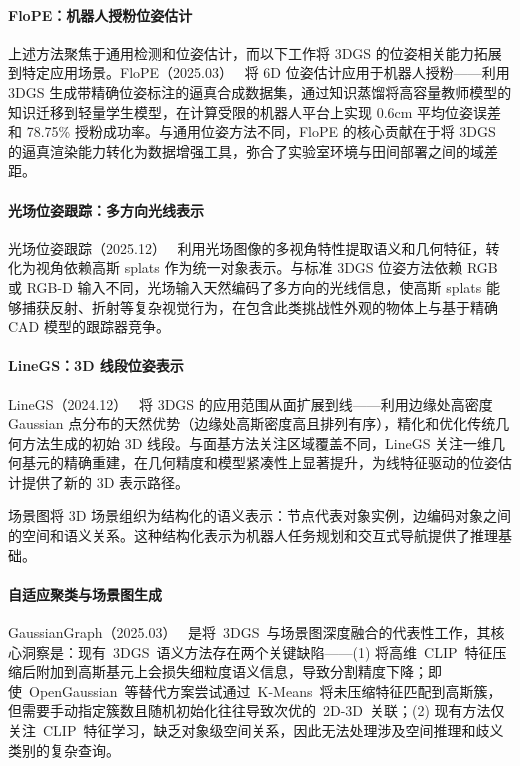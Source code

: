 \paragraph{FloPE：机器人授粉位姿估计} 上述方法聚焦于通用检测和位姿估计，而以下工作将 3DGS 的位姿相关能力拓展到特定应用场景。FloPE（2025.03）~\cite{2503_11692} 将 6D 位姿估计应用于机器人授粉——利用 3DGS 生成带精确位姿标注的逼真合成数据集，通过知识蒸馏将高容量教师模型的知识迁移到轻量学生模型，在计算受限的机器人平台上实现 0.6cm 平均位姿误差和 78.75\% 授粉成功率。与通用位姿方法不同，FloPE 的核心贡献在于将 3DGS 的逼真渲染能力转化为数据增强工具，弥合了实验室环境与田间部署之间的域差距。

\paragraph{光场位姿跟踪：多方向光线表示} 光场位姿跟踪（2025.12）~\cite{2512_13007} 利用光场图像的多视角特性提取语义和几何特征，转化为视角依赖高斯 splats 作为统一对象表示。与标准 3DGS 位姿方法依赖 RGB 或 RGB-D 输入不同，光场输入天然编码了多方向的光线信息，使高斯 splats 能够捕获反射、折射等复杂视觉行为，在包含此类挑战性外观的物体上与基于精确 CAD 模型的跟踪器竞争。

\paragraph{LineGS：3D 线段位姿表示} LineGS（2024.12）~\cite{2412_00477} 将 3DGS 的应用范围从面扩展到线——利用边缘处高密度 Gaussian 点分布的天然优势（边缘处高斯密度高且排列有序），精化和优化传统几何方法生成的初始 3D 线段。与面基方法关注区域覆盖不同，LineGS 关注一维几何基元的精确重建，在几何精度和模型紧凑性上显著提升，为线特征驱动的位姿估计提供了新的 3D 表示路径。

场景图将 3D 场景组织为结构化的语义表示：节点代表对象实例，边编码对象之间的空间和语义关系。这种结构化表示为机器人任务规划和交互式导航提供了推理基础。

\paragraph{自适应聚类与场景图生成}

GaussianGraph（2025.03）~\cite{2503_04034} 是将~3DGS~与场景图深度融合的代表性工作，其核心洞察是：现有~3DGS~语义方法存在两个关键缺陷——(1) 将高维~CLIP~特征压缩后附加到高斯基元上会损失细粒度语义信息，导致分割精度下降；即使~OpenGaussian~等替代方案尝试通过~K-Means~将未压缩特征匹配到高斯簇，但需要手动指定簇数且随机初始化往往导致次优的~2D-3D~关联；(2) 现有方法仅关注~CLIP~特征学习，缺乏对象级空间关系，因此无法处理涉及空间推理和歧义类别的复杂查询。

